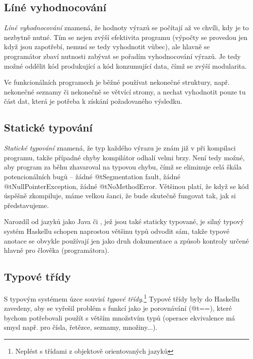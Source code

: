 
\subsection{Líné vyhodnocování}

\emph{Líné vyhodnocování} znamená, že hodnoty výrazů se počítají až ve chvíli,
kdy je to nezbytně nutné. Tím se nejen zvýší efektivita programu (výpočty se
provedou jen když jsou zapotřebí, nemusí se tedy vyhodnotit vůbec), ale hlavně
se programátor zbaví nutnosti zabývat se pořadím vyhodnocování výrazů. Je tedy možné
oddělit kód produkující a kód konzumující data, čímž se zvýší modularita. 


Ve funkcionálních programech je běžné používat nekonečné struktury, např.
nekonečné seznamy či nekonečně se větvící stromy, a nechat vyhodnotit pouze tu
část dat, která je potřeba k získání požadovaného výsledku.

\subsection{Statické typování}

\emph{Statické typování} znamená, že typ každého výrazu je znám již v při
kompilaci programu, takže případné chyby kompilátor odhalí velmi brzy. Není tedy
možné, aby program za běhu zhavaroval na typovou chybu, čímž se eliminuje celá
škála potencionálních bugů -- žádné @t{Segmentation fault}, žádné
@t{NullPointerException}, žádné @t{NoMethodError}. Většinou platí, že když se
kód úspěšně zkompiluje, máme velkou šanci, že bude skutečně fungovat tak, jak si
představujeme.

Narozdíl od jazyků jako Java či \Cplusplus, jež jsou také staticky typované, je
silný typový systém Haskellu schopen naprostou většinu typů odvodit sám, takže
typové anotace se obvykle používají jen jako druh dokumentace a způsob kontroly
určené hlavně pro člověka (programátora).

\subsection{Typové třídy}

S typovým systémem úzce souvisí \emph{typové třídy}.\footnote{Neplést s třídami
z objektově orientovaných jazyků} Typové třídy byly do Haskellu zavedeny, aby se
vyřešil problém s  funkcí jako je porovnávání (@t{==}), které
bychom potřebovali použít s větším množstvím typů (operace ekvivalence má smysl
např. pro čísla, řetězce, seznamy, množiny...).

